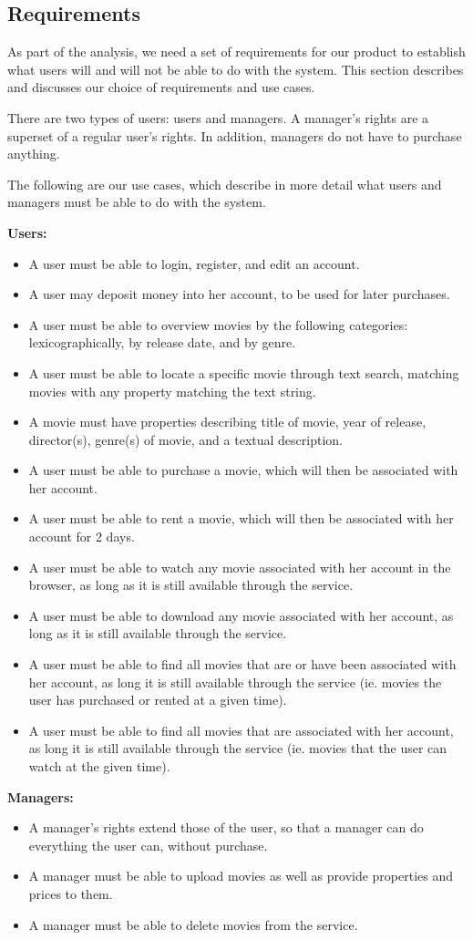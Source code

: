\subsection{Requirements}
As part of the analysis, we need a set of requirements for our product to establish what users will and will not be able to do with the system. This section describes and discusses our choice of requirements and use cases.


There are two types of users: users and managers. A manager’s rights are a superset of a regular user’s rights. In addition, managers do not have to purchase anything.


The following are our use cases, which describe in more detail what users and managers must be able to do with the system.

\textbf{Users:}
\begin{itemize}
\item A user must be able to login, register, and edit an account.
\item A user may deposit money into her account, to be used for later purchases.
\item A user must be able to overview movies by the following categories: lexicographically, by release date, and by genre.
\item A user must be able to locate a specific movie through text search, matching movies with any property matching the text string.
\item A movie must have properties describing title of movie, year of release, director(s), genre(s) of movie, and a textual description.
\item A user must be able to purchase a movie, which will then be associated with her account.
\item A user must be able to rent a movie, which will then be associated with her account for 2 days.
\item A user must be able to watch any movie associated with her account in the browser, as long as it is still available through the service.
\item A user must be able to download any movie associated with her account, as long as it is still available through the service.
\item A user must be able to find all movies that are or have been associated with her account, as long it is still available through the service (ie. movies the user has purchased or rented at a given time).
\item A user must be able to find all movies that are associated with her account, as long it is still available through the service (ie. movies that the user can watch at the given time).
\end{itemize}
\textbf{Managers:}
\begin{itemize}
\item A manager's rights extend those of the user, so that a manager can do everything the user can, without purchase.
\item A manager must be able to upload movies as well as provide properties and prices to them.
\item A manager must be able to delete movies from the service.
\end{itemize}

